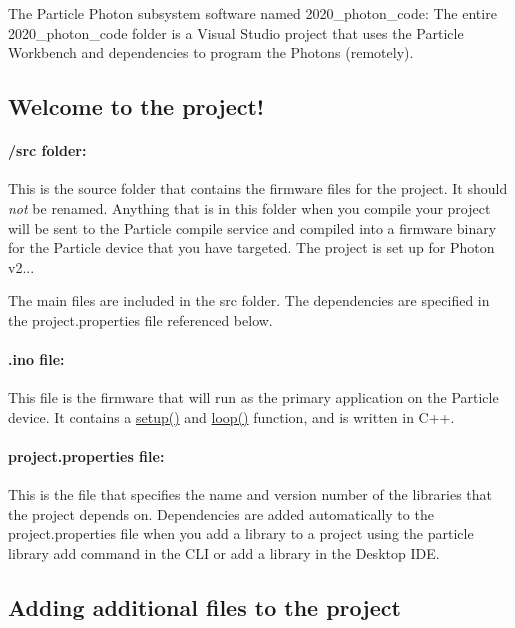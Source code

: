 The Particle Photon subsystem software named 2020\+\_\+photon\+\_\+code\+: The entire \textquotesingle{}2020\+\_\+photon\+\_\+code\textquotesingle{} folder is a Visual Studio project that uses the Particle Workbench and dependencies to program the Photons (remotely). \subsection*{Welcome to the project!}

\paragraph*{{\ttfamily /src} folder\+:}

This is the source folder that contains the firmware files for the project. It should {\itshape not} be renamed. Anything that is in this folder when you compile your project will be sent to the Particle compile service and compiled into a firmware binary for the Particle device that you have targeted. The project is set up for Photon v2...

The main files are included in the {\ttfamily src} folder. The dependencies are specified in the {\ttfamily project.\+properties} file referenced below.

\paragraph*{{\ttfamily .ino} file\+:}

This file is the firmware that will run as the primary application on the Particle device. It contains a {\ttfamily \hyperlink{1-parser-_json_parser_generator_r_k_8cpp_a4fc01d736fe50cf5b977f755b675f11d}{setup()}} and {\ttfamily \hyperlink{1-parser-_json_parser_generator_r_k_8cpp_afe461d27b9c48d5921c00d521181f12f}{loop()}} function, and is written in C++.

\paragraph*{{\ttfamily project.\+properties} file\+:}

This is the file that specifies the name and version number of the libraries that the project depends on. Dependencies are added automatically to the {\ttfamily project.\+properties} file when you add a library to a project using the {\ttfamily particle library add} command in the C\+LI or add a library in the Desktop I\+DE.

\subsection*{Adding additional files to the project}


